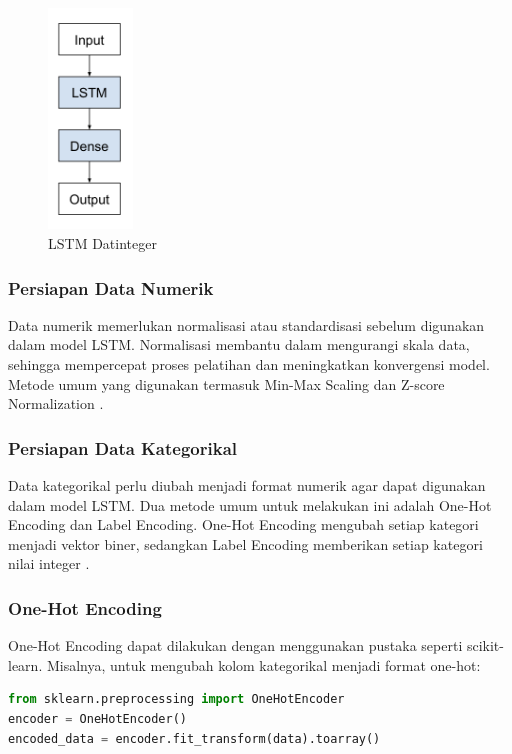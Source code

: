\begin{figure}[h]
    \centering
    \includegraphics[width=0.2\textwidth]{images/lstm1.png} 
    \caption{ LSTM Datinteger \parencite{brownlee2017}}
    \label{fig:lstm_architecture}
\end{figure}
\subsubsection{Persiapan Data Numerik}
\par Data numerik memerlukan normalisasi atau standardisasi sebelum digunakan dalam model LSTM. Normalisasi membantu dalam mengurangi skala data, sehingga mempercepat proses pelatihan dan meningkatkan konvergensi model. Metode umum yang digunakan termasuk Min-Max Scaling dan Z-score Normalization \parencite{brownlee2017}.


\subsubsection{Persiapan Data Kategorikal}
\par Data kategorikal perlu diubah menjadi format numerik agar dapat digunakan dalam model LSTM. Dua metode umum untuk melakukan ini adalah One-Hot Encoding dan Label Encoding. One-Hot Encoding mengubah setiap kategori menjadi vektor biner, sedangkan Label Encoding memberikan setiap kategori nilai integer \parencite{brownlee2017}.

\subsubsection{One-Hot Encoding}
\par One-Hot Encoding dapat dilakukan dengan menggunakan pustaka seperti scikit-learn. Misalnya, untuk mengubah kolom kategorikal menjadi format one-hot:
\begin{lstlisting}[language=Python, caption=Contoh One-Hot Encoding (scikit-learn)]
from sklearn.preprocessing import OneHotEncoder
encoder = OneHotEncoder()
encoded_data = encoder.fit_transform(data).toarray()
\end{lstlisting}





